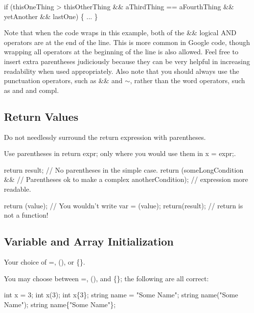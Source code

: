 \begin{DoxyCode}
\textcolor{keywordflow}{if} (thisOneThing > thisOtherThing &&
    aThirdThing == aFourthThing &&
    yetAnother && lastOne) \{
    ...
\}
\end{DoxyCode}


Note that when the code wraps in this example, both of the \&\& logical A\+ND operators are at the end of the line. This is more common in Google code, though wrapping all operators at the beginning of the line is also allowed. Feel free to insert extra parentheses judiciously because they can be very helpful in increasing readability when used appropriately. Also note that you should always use the punctuation operators, such as \&\& and $\sim$, rather than the word operators, such as and and compl.

\subsection*{Return Values}

Do not needlessly surround the return expression with parentheses.

Use parentheses in {\ttfamily return expr;} only where you would use them in {\ttfamily x = expr;}.


\begin{DoxyCode}
\textcolor{keywordflow}{return} result;                  \textcolor{comment}{// No parentheses in the simple case.}
\textcolor{keywordflow}{return} (someLongCondition &&    \textcolor{comment}{// Parentheses ok to make a complex}
        anotherCondition);      \textcolor{comment}{//     expression more readable.}

\textcolor{keywordflow}{return} (value);                \textcolor{comment}{// You wouldn't write var = (value);}
\textcolor{keywordflow}{return}(result);                \textcolor{comment}{// return is not a function!}
\end{DoxyCode}


\subsection*{Variable and Array Initialization}

Your choice of {\ttfamily =}, {\ttfamily ()}, or {\ttfamily \{\}}.

You may choose between {\ttfamily =}, {\ttfamily ()}, and {\ttfamily \{\}}; the following are all correct\+:


\begin{DoxyCode}
\textcolor{keywordtype}{int} x = 3;
\textcolor{keywordtype}{int} x(3);
\textcolor{keywordtype}{int} x\{3\};
\textcolor{keywordtype}{string} name = \textcolor{stringliteral}{"Some Name"};
\textcolor{keywordtype}{string} name(\textcolor{stringliteral}{"Some Name"});
\textcolor{keywordtype}{string} name\{\textcolor{stringliteral}{"Some Name"}\};
\end{DoxyCode}


